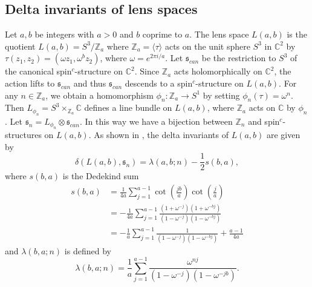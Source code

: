 \documentclass{amsart}
\theoremstyle{definition}
\theoremstyle{remark}
\numberwithin{equation}{section}
\begin{document}
\subsection{Delta invariants of lens spaces}\label{sec:deltalens}

Let $a,b$ be integers with $a > 0$ and $b$ coprime to $a$. The lens space $L(a,b)$ is the quotient $L(a,b) = S^3/\mathbb{Z}_a$ where $\mathbb{Z}_a = \langle \tau \rangle$ acts on the unit sphere $S^3$ in $\mathbb{C}^2$ by $\tau(z_1 , z_2) = ( \omega z_1 , \omega^b z_2)$, where $\omega = e^{2\pi i/a}$. Let $\mathfrak{s}_{can}$ be the restriction to $S^3$ of the canonical spin$^c$-structure on $\mathbb{C}^2$. Since $\mathbb{Z}_a$ acts holomorphically on $\mathbb{C}^2$, the action lifts to $\mathfrak{s}_{can}$ and thus $\mathfrak{s}_{can}$ descends to a spin$^c$-structure on $L(a,b)$. For any $n \in \mathbb{Z}_a$, we obtain a homomorphism $\phi_n \colon \mathbb{Z}_a \to S^1$ by setting $\phi_n(\tau) = \omega^n$. Then $L_{\phi_n} = S^3 \times_{\mathbb{Z}_a} \mathbb{C}$ defines a line bundle on $L(a,b)$, where $\mathbb{Z}_a$ acts on $\mathbb{C}$ by $\phi_n$. Let $\mathfrak{s}_n = L_{\phi_n} \otimes \mathfrak{s}_{can}$. In this way we have a bijection between $\mathbb{Z}_n$ and spin$^c$-structures on $L(a,b)$. As shown in \cite[]{bar}, the delta invariants of $L(a,b)$ are given by
\[
\delta( L(a,b) , \mathfrak{s}_n ) = \lambda(a,b;n) - \frac{1}{2} s(b,a),
\]
where $s(b,a)$ is the Dedekind sum
\begin{align*}
s(b,a) &= \frac{1}{4a} \sum_{j=1}^{a-1} \cot \left( \frac{jb}{a} \right) \cot \left( \frac{j}{a} \right) \\
& = -\frac{1}{4a} \sum_{j=1}^{a-1} \frac{ (1+\omega^{-j})(1+\omega^{-bj})}{(1-\omega^{-j})(1-\omega^{-bj}) } \\
& = - \frac{1}{a} \sum_{j=1}^{a-1} \frac{1}{(1-\omega^{-j})(1-\omega^{-bj}) } + \frac{a-1}{4a}
\end{align*}
and $\lambda(b,a;n)$ is defined by 
\[
\lambda(b,a;n) = \frac{1}{a} \sum_{j=1}^{a-1} \frac{ \omega^{nj} }{(1-\omega^{-j})(1-\omega^{-jb})}.
\]
\end{document}
